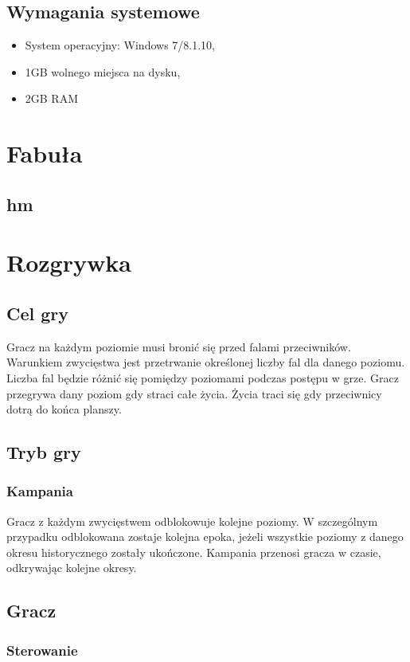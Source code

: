\documentclass[a4paper,12pt, twoside, titlepage]{article}
\begin{document}
\subsection{Wymagania systemowe}
\begin{itemize}
	\item System operacyjny: Windows 7/8.1.10,
	\item 1GB wolnego miejsca na dysku,
	\item 2GB RAM
\end{itemize}


\newpage
\section{Fabuła}
\subsection{hm}
\newpage
\section{Rozgrywka}
\subsection{Cel gry}
Gracz na każdym poziomie musi bronić się przed falami przeciwników. Warunkiem zwycięstwa jest przetrwanie określonej liczby fal dla danego poziomu. Liczba fal będzie różnić się pomiędzy poziomami podczas postępu w grze. Gracz przegrywa dany poziom gdy straci całe życia. Życia traci się gdy przeciwnicy dotrą do końca planszy.

\subsection{Tryb gry}
\subsubsection{Kampania}
Gracz z każdym zwycięstwem odblokowuje kolejne poziomy. W szczególnym przypadku odblokowana zostaje kolejna epoka, jeżeli wszystkie poziomy z danego okresu historycznego zostały ukończone. Kampania przenosi gracza w czasie, odkrywając kolejne okresy.

\subsection{Gracz}
\subsubsection{Sterowanie}
\end{document}
